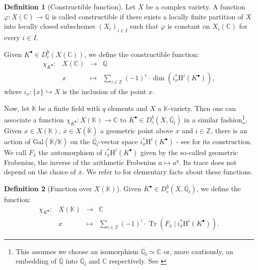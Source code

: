 \documentclass[11pt,english]{article}
\numberwithin{equation}{section}
\numberwithin{figure}{section}
\theoremstyle{definition}
\newtheorem{df}{Definition}[subsection]
\theoremstyle{plain}
\theoremstyle{remark}
\DeclareMathOperator{\Tr}{Tr}
\newcommand\HH{\mathrm{H}}
\newcommand\ZZ{\mathbb{Z}}
\newcommand\QQ{\mathbb{Q}}
\newcommand\KK{\mathbb{K}}
\newcommand\CC{\mathbb{C}}
\begin{document}
\begin{df}[Constructible function]

Let $X$ be a complex variety. A function $\varphi:X(\CC)\rightarrow\QQ$
is called constructible if there exists a locally finite partition
of $X$ into locally closed subschemes $(X_{i})_{i\in I}$ such that
$\varphi$ is constant on $X_{i}(\CC)$ for every $i\in I$.

Given $K^{\bullet}\in D_{\mathrm{c}}^{b}(X(\CC))$, we define the
constructible function:\[
\begin{array}{rrcl}
\chi_{K^{\bullet}}: & X(\CC) & \rightarrow & \QQ \\
 & x & \mapsto & \sum_{i\in\ZZ}(-1)^i\cdot\dim\left(i_x^*\HH^i(K^{\bullet})\right),
\end{array}
\] where $i_{x}:\{x\}\hookrightarrow X$ is the inclusion of the point
$x$.

\end{df}

Now, let $\KK$ be a finite field with $q$ elements and $X$ a $\KK$-variety.
Then one can associate a function $\chi_{K^{\bullet}}:X(\KK)\rightarrow\CC$
to $K^{\bullet}\in D_{\mathrm{c}}^{b}(X,\bar{\QQ_{l}})$ in a similar
fashion\footnote{This assumes we choose an isomorphism $\bar{\QQ_{l}}\simeq\CC$ or,
more cautiously, an embedding of $\bar{\QQ}$ into $\bar{\QQ_{l}}$
and $\CC$ respectively. See \cite[Rem. 1.2.11.]{Del80}}. Given $x\in X(\KK)$, $\overline{x}\in X(\bar{\KK})$ a geometric
point above $x$ and $i\in\ZZ$, there is an action of $\mathrm{Gal}(\overline{\KK}/\KK)$
on the $\bar{\QQ_{l}}$-vector space $i_{\overline{x}}^{*}\HH^{i}(K^{\bullet})$
- see \cite[\S 1.1.]{KW01} for its construction. We call $F_{\overline{x}}$
the automorphism of $i_{\overline{x}}^{*}\HH^{i}(K^{\bullet})$ given
by the so-called geometric Frobenius, the inverse of the arithmetic
Frobenius $a\mapsto a^{q}$. Its trace does not depend on the choice
of $\overline{x}$. We refer to \cite[\S III.12.]{KW01} for elementary
facts about these functions.

\begin{df}[Function over $X(\KK)$]

Given $K^{\bullet}\in D_{\mathrm{c}}^{b}(X,\bar{\QQ_{l}})$, we define
the function:\[
\begin{array}{rrcl}
\chi_{K^{\bullet}}: & X(\KK) & \rightarrow & \CC \\
 & x & \mapsto & \sum_{i\in\ZZ}(-1)^i\cdot\Tr\left( F_{\overline{x}}\ \vert\ i_{\overline{x}}^*\HH^i(K^{\bullet})\right).
\end{array}
\]

\end{df}
\end{document}
